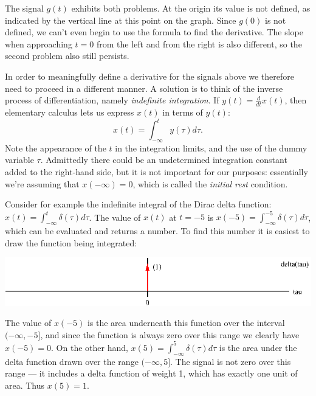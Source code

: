 \documentclass[10pt]{beamer}
\begin{document}
The signal $g(t)$ exhibits both problems.  At the origin its value is not defined, as indicated by the vertical line at this point on the graph.  Since $g(0)$ is not defined, we can't even begin to use the formula to find the derivative.  The slope when approaching $t=0$ from the left and from the right is also different, so the second problem also still persists.

In order to meaningfully define a derivative for the signals above we therefore need to proceed in a different manner.  A solution is to think of the inverse process of differentiation, namely {\em indefinite integration}.  If $y(t) = \frac{d}{dt} x(t)$, then elementary calculus lets us express $x(t)$ in terms of $y(t)$:
\begin{equation*}
  x(t) = \int_{-\infty}^t y(\tau) d\tau.
\end{equation*}
Note the appearance of the $t$ in the integration limits, and the use of the dummy variable $\tau$.  Admittedly there could be an undetermined integration constant added to the right-hand side, but it is not important for our purposes:  essentially we're assuming that $x(-\infty) = 0$, which is called the {\em initial rest} condition.

\begin{center}
\end{center}

Consider for example the indefinite integral of the Dirac delta function:  $x(t) = \int_{-\infty}^t \delta(\tau) d\tau$.  The value of $x(t)$ at $t=-5$ is $x(-5) = \int_{-\infty}^{-5} \delta(\tau) d\tau$, which can be evaluated and returns a number.  To find this number it is easiest to draw the function being integrated:
\begin{center}
  \includegraphics{deltafunctiontau}
\end{center}
The value of $x(-5)$ is the area underneath this function over the interval $(-\infty, -5]$, and since the function is always zero over this range we clearly have $x(-5) = 0$.  On the other hand, $x(5) = \int_{-\infty}^{5} \delta(\tau) d\tau$ is the area under the delta function drawn over the range $(-\infty, 5]$.  The signal is not zero over this range --- it includes a delta function of weight 1, which has exactly one unit of area.  Thus $x(5) = 1$.  
\end{document}
